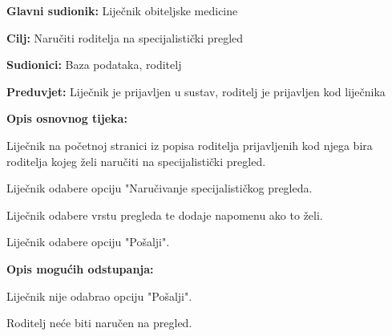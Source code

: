 					\noindent {}
					\begin{packed_item}
						
						\item \textbf{Glavni sudionik: }Liječnik obiteljske medicine
						\item  \textbf{Cilj:} Naručiti roditelja na specijalistički pregled
						\item  \textbf{Sudionici:} Baza podataka, roditelj
						\item  \textbf{Preduvjet:} Liječnik je prijavljen u sustav, roditelj je prijavljen kod liječnika
						\item  \textbf{Opis osnovnog tijeka:}
						
						\item[] \begin{packed_enum}
							
							\item Liječnik na početnoj stranici iz popisa roditelja prijavljenih kod njega bira roditelja kojeg želi naručiti na specijalistički pregled.
							\item Liječnik odabere opciju "Naručivanje specijalističkog pregleda.
							\item Liječnik odabere vrstu pregleda te dodaje napomenu ako to želi.
							\item Liječnik odabere opciju "Pošalji".
						\end{packed_enum}
						
						\item  \textbf{Opis mogućih odstupanja:}
						
						\item[] \begin{packed_item}
							
							\item[4.a] Liječnik nije odabrao opciju "Pošalji".
							\item[] \begin{packed_enum}
								
								\item Roditelj neće biti naručen na pregled.
							\end{packed_enum}
							
							
						\end{packed_item}
						
						
					\end{packed_item}
					
